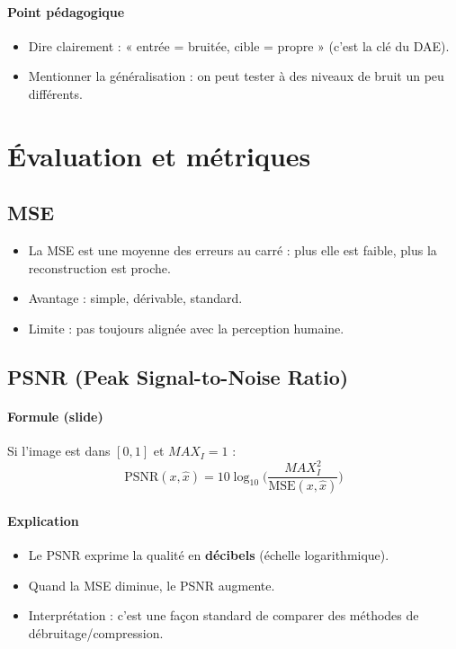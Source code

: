 \documentclass[11pt,a4paper]{article}
\begin{document}
\paragraph{Point pédagogique}
\begin{itemize}
  \item Dire clairement : « entrée = bruitée, cible = propre » (c'est la clé du DAE).
  \item Mentionner la généralisation : on peut tester à des niveaux de bruit un peu différents.
\end{itemize}

\section{Évaluation et métriques}

\subsection{MSE}
\begin{itemize}
  \item La MSE est une moyenne des erreurs au carré : plus elle est faible, plus la reconstruction est proche.
  \item Avantage : simple, dérivable, standard.
  \item Limite : pas toujours alignée avec la perception humaine.
\end{itemize}

\subsection{PSNR (Peak Signal-to-Noise Ratio)}
\paragraph{Formule (slide)}
Si l'image est dans $[0,1]$ et $MAX_I=1$ :
\[
\mathrm{PSNR}(x,\hat{x}) = 10\log_{10}\Big(\frac{MAX_I^2}{\mathrm{MSE}(x,\hat{x})}\Big)
\]
\paragraph{Explication}
\begin{itemize}
  \item Le PSNR exprime la qualité en \textbf{décibels} (échelle logarithmique).
  \item Quand la MSE diminue, le PSNR augmente.
  \item Interprétation : c'est une façon standard de comparer des méthodes de débruitage/compression.
\end{itemize}
\end{document}
